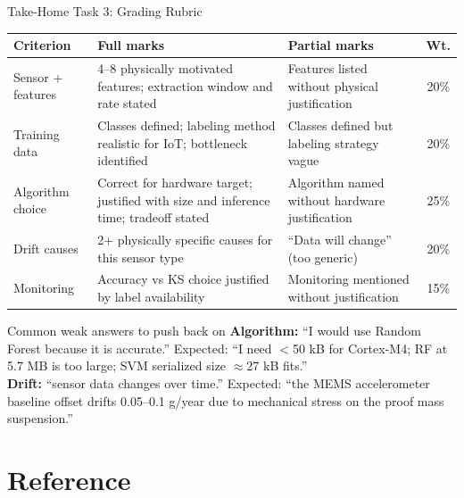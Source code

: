 \documentclass[aspectratio=169,11pt]{beamer}
\begin{document}
\begin{frame}{Take-Home Task 3: Grading Rubric}
    \begin{center}
    \footnotesize
    \begin{tabular}{p{3.0cm}p{3.8cm}p{3.5cm}c}
        \toprule
        \textbf{Criterion} & \textbf{Full marks} & \textbf{Partial marks} & \textbf{Wt.} \\
        \midrule
        Sensor + features & 4--8 physically motivated features; extraction window and rate stated & Features listed without physical justification & 20\% \\
        Training data & Classes defined; labeling method realistic for IoT; bottleneck identified & Classes defined but labeling strategy vague & 20\% \\
        Algorithm choice & Correct for hardware target; justified with size and inference time; tradeoff stated & Algorithm named without hardware justification & 25\% \\
        Drift causes & 2+ physically specific causes for this sensor type & ``Data will change'' (too generic) & 20\% \\
        Monitoring & Accuracy vs KS choice justified by label availability & Monitoring mentioned without justification & 15\% \\
        \bottomrule
    \end{tabular}
    \normalsize
    \end{center}

    \vspace{0.1cm}
    \begin{alertblock}{Common weak answers to push back on}
        \textbf{Algorithm:} ``I would use Random Forest because it is accurate.'' Expected: ``I need $<$50 kB for Cortex-M4; RF at 5.7 MB is too large; SVM serialized size $\approx$27 kB fits.''\\
        \textbf{Drift:} ``sensor data changes over time.'' Expected: ``the MEMS accelerometer baseline offset drifts 0.05--0.1 g/year due to mechanical stress on the proof mass suspension.''
    \end{alertblock}
\end{frame}

\section{Reference}
\end{document}
